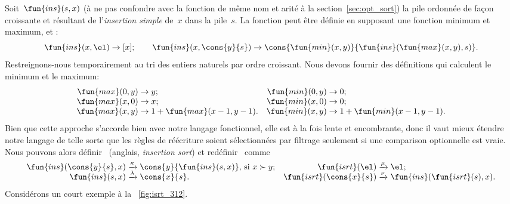 Soit~\(\fun{ins}(s,x)\) (à ne pas confondre
avec la fonction de même nom et arité à la section~\ref{sec:opt_sort})
la pile ordonnée de façon croissante et résultant de l'\emph{insertion
  simple} de~\(x\) dans la pile~\(s\). La fonction  peut
être définie en supposant une fonction minimum et maximum,
 et
:
\begin{equation*}
\fun{ins}(x,\el)         \rightarrow [x];\qquad
\fun{ins}(x,\cons{y}{s}) \rightarrow
   \cons{\fun{min}(x,y)}{\fun{ins}(\fun{max}(x,y),s)}.
\end{equation*}
Restreignons-nous temporairement au tri des entiers naturels par ordre
croissant. Nous devons fournir des définitions qui calculent le
minimum et le maximum:
\begin{equation*}
\begin{array}{@{}r@{\;}l@{\;}lr@{\;}l@{\;}l@{}}
  \fun{max}(0,y) & \rightarrow & y; & \fun{min}(0,y) & \rightarrow & 0;\\
  \fun{max}(x,0) & \rightarrow & x; & \fun{min}(x,0) & \rightarrow & 0;\\
  \fun{max}(x,y) & \rightarrow & 1 + \fun{max}(x-1,y-1).
& \fun{min}(x,y) & \rightarrow & 1 + \fun{min}(x-1,y-1).
\end{array}
\end{equation*}
Bien que cette approche s'accorde bien avec notre langage fonctionnel,
elle est à la fois lente et encombrante, donc il vaut mieux étendre
notre langage de telle sorte que les règles de réécriture soient
sélectionnées par filtrage seulement si une comparison optionnelle est
vraie. Nous pouvons alors
définir~ (anglais,
\emph{insertion sort}) et
redéfinir~ comme
\begin{equation*}
\begin{array}{@{}r@{\;}l@{\;}lr@{\;}l@{\;}l@{}}
  \fun{ins}(\cons{y}{s},x)
& \xrightarrow{\smash{\kappa}}
& \cons{y}{\fun{ins}(s,x)}, \,\text{si \(x \succ y\)};
& \fun{isrt}(\el)
& \xrightarrow{\smash{\mu}}
& \el;\\
  \fun{ins}(s,x)
& \xrightarrow{\smash{\lambda}}
& \cons{x}{s}.
& \fun{isrt}(\cons{x}{s})
& \xrightarrow{\smash{\nu}}
& \fun{ins}(\fun{isrt}(s),x).
\end{array}
\end{equation*}
Considérons un court exemple à la \fig~\vref{fig:isrt_312}.
